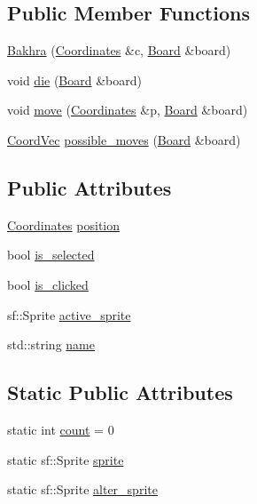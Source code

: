 \subsection*{Public Member Functions}
\begin{DoxyCompactItemize}
\item 
\mbox{\hyperlink{class_bakhra_a89d45256f1c671abb089dd1a3cc3f0f0}{Bakhra}} (\mbox{\hyperlink{class_coordinates}{Coordinates}} \&c, \mbox{\hyperlink{class_board}{Board}} \&board)
\item 
void \mbox{\hyperlink{class_bakhra_a851d699afa7dc2180e1aaf18bd6160f9}{die}} (\mbox{\hyperlink{class_board}{Board}} \&board)
\item 
void \mbox{\hyperlink{class_bakhra_ad70dced66c2d952d6268ae12d4ebd4f0}{move}} (\mbox{\hyperlink{class_coordinates}{Coordinates}} \&p, \mbox{\hyperlink{class_board}{Board}} \&board)
\item 
\mbox{\hyperlink{main_8cpp_a267937870648899c879128d3199195ec}{Coord\+Vec}} \mbox{\hyperlink{class_bakhra_a1df8a0eaf723807f8293d97edf701d46}{possible\+\_\+moves}} (\mbox{\hyperlink{class_board}{Board}} \&board)
\end{DoxyCompactItemize}
\subsection*{Public Attributes}
\begin{DoxyCompactItemize}
\item 
\mbox{\hyperlink{class_coordinates}{Coordinates}} \mbox{\hyperlink{class_piece_a3a789618e64cb8139a2bc79f44bb6edb}{position}}
\item 
bool \mbox{\hyperlink{class_piece_a21b7b54849acd46163b4b6281b5b0e57}{is\+\_\+selected}}
\item 
bool \mbox{\hyperlink{class_piece_ab2ba8aa3a4471ff1a5400fe0617657cb}{is\+\_\+clicked}}
\item 
sf\+::\+Sprite \mbox{\hyperlink{class_piece_a65fa621a87983d21756c2d2d63e8189b}{active\+\_\+sprite}}
\item 
std\+::string \mbox{\hyperlink{class_piece_aceb5b0dda6aa7ac881abe103bb98ac7e}{name}}
\end{DoxyCompactItemize}
\subsection*{Static Public Attributes}
\begin{DoxyCompactItemize}
\item 
static int \mbox{\hyperlink{class_bakhra_aaa910ecd4daa7e9544f714bcc59bea5c}{count}} = 0
\item 
static sf\+::\+Sprite \mbox{\hyperlink{class_bakhra_a4dce75f87c5302ed0f9960e1596a0683}{sprite}}
\item 
static sf\+::\+Sprite \mbox{\hyperlink{class_bakhra_a40815fd60319b4583844b8897cfdca32}{alter\+\_\+sprite}}
\end{DoxyCompactItemize}


